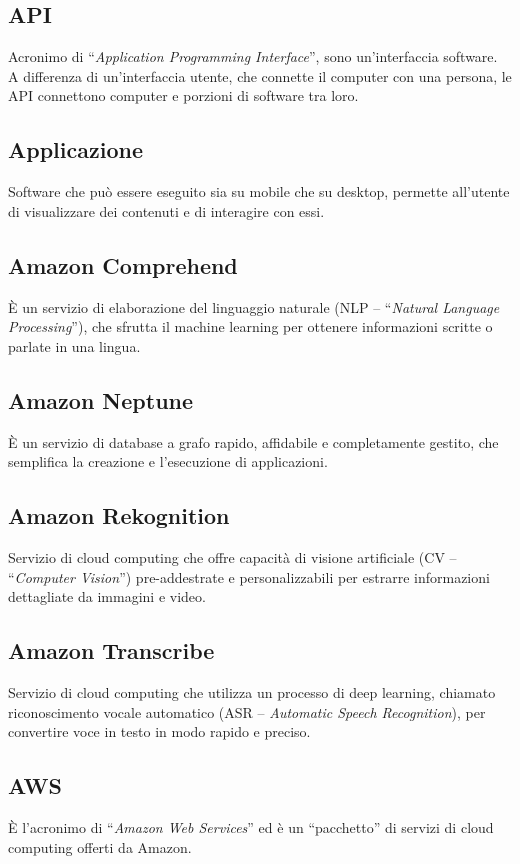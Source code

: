 \subsection{API}
Acronimo di “\textit{Application Programming Interface}”, sono un’interfaccia software. A differenza di un’interfaccia utente, che connette il computer con una persona, le API connettono computer e porzioni di software tra loro.

\subsection{Applicazione}
Software che può essere eseguito sia su mobile che su desktop, permette all’utente di visualizzare dei contenuti e di interagire con essi.

\subsection{Amazon Comprehend}
È un servizio di elaborazione del linguaggio naturale (NLP – “\textit{Natural Language Processing}”), che sfrutta il machine learning per ottenere informazioni scritte o parlate in una lingua. 

\subsection{Amazon Neptune}
È un servizio di database a grafo rapido, affidabile e completamente gestito, che semplifica la creazione e l’esecuzione di applicazioni. 

\subsection{Amazon Rekognition}
Servizio di cloud computing che offre capacità di visione artificiale (CV – “\textit{Computer Vision}”) pre-addestrate e personalizzabili per estrarre informazioni dettagliate da immagini e video. 

\subsection{Amazon Transcribe}

Servizio di cloud computing che utilizza un processo di deep learning, chiamato riconoscimento vocale automatico (ASR – \textit{Automatic Speech Recognition}), per convertire voce in testo in modo rapido e preciso.

\subsection{AWS}
È l’acronimo di “\textit{Amazon Web Services}” ed è un “pacchetto” di servizi di cloud computing offerti da Amazon. 

\clearpage 